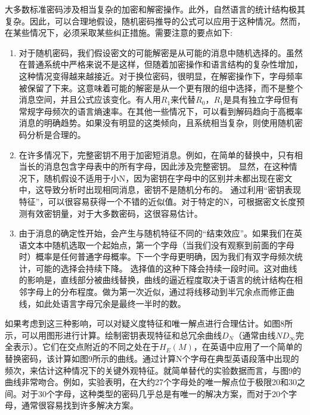 \documentclass[]{article}
\begin{document}
大多数标准密码涉及相当复杂的加密和解密操作。此外，自然语言的统计结构极其复杂。因此，可以合理地假设，随机密码推导的公式可以应用于这种情况。然而，在某些情况下，必须采取某些纠正措施。需要注意的要点如下:
\begin{enumerate}
	\item 对于随机密码，我们假设密文的可能解密是从可能的消息中随机选择的。虽然在普通系统中严格来说不是这样，但随着加密操作和语言结构的复杂性增加，这种情况变得越来越接近。对于换位密码，很明显，在解密操作下，字母频率被保留了下来。这意味着可能的解密是从一个更有限的组中选择，而不是整个消息空间，并且公式应该变化。有人用$R_1$来代替$R_0$，$R_1$是具有独立字母但有常规字母频次的语言熵速率。在其他一些情况下，可以看到解码趋向于高概率消息的明确趋势。如果没有明显的这类倾向，且系统相当复杂，则使用随机密码分析是合理的。
	\item 在许多情况下，完整密钥不用于加密短消息。例如，在简单的替换中，只有相当长的消息包含字母表中的所有字母，因此涉及完整密钥。
	显然，在这种情况下，随机假设不适用于小N，因为密钥在字母中的区别并未都出现在密文中，这导致分析时出现相同消息，密钥不是随机分布的。
	通过利用“密钥表现特征”，可以很容易获得一个不错的近似值。对于特定的N，可根据密文长度预测有效密钥量，对于大多数密码，这很容易估计。
	\item 由于消息的确定性开始，会产生与随机特征不同的“结束效应”。如果我们在英语文本中随机选取一个起始点，第一个字母（当我们没有观察到前面的字母时）概率是任何普通字母概率。下一个字母更明确，因为我们有双字母频次统计，可能的选择会持续下降。
	选择值的这种下降会持续一段时间。这对曲线的影响是，直线部分被曲线替换，曲线的逼近程度取决于语言的统计结构在相邻字母上的分布程度。做为第一次近似，通过将线移动到半冗余点而修正曲线，如此处语言字母冗余是最终一半时的数。
\end{enumerate}

如果考虑到这三种影响，可以对疑义度特征和唯一解点进行合理估计。如图8所示，可以用图形进行计算。绘制密钥表现特征和总冗余曲线$D_N$（通常由线$ND_{\infty}$完全表示）。它们在交点附近的不同之处在于$H_E(M)$，在英语中应用了一个简单的替换密码，该计算如图9所示的曲线。通过计算N个字母在典型英语段落中出现的频次，来估计这种情况下的关键外观特征。就简单替代的实验数据而言，与图9的曲线非常吻合。例如，实验表明，在大约27个字母处的唯一解点位于极限20和30之间。对于30个字母，这种类型的密码几乎总是有唯一的解决方案，而对于20个字母，通常很容易找到许多解决方案。
\end{document}

